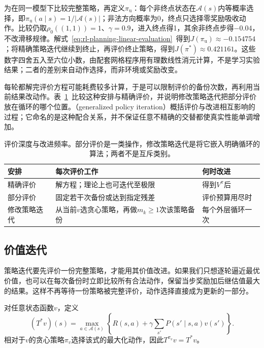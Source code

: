 为在同一模型下比较完整策略，再定义$\pi_{\mathrm u}$：每个非终点状态在$\mathcal A(s)$内等概率选择，即$\pi_{\mathrm u}(a\mid s)=1/|\mathcal A(s)|$；非法方向概率为0，终点只选择零奖励吸收动作。比较仍取$\rho_0((1,1))=1$、$\gamma=0.9$，进入终点得1，其余非终点步得$-0.04$，不改滑移规律。解式~\eqref{eq:rl-planning-linear-evaluation}~得到$J(\pi_{\mathrm u})\approx-0.154754$；将精确策略迭代继续到终止，再评价终止策略，得到$J(\pi^*)\approx0.421161$。这些数字四舍五入至六位小数，由配套网格程序用有理数线性消元计算，不是学习实验结果；二者的差别来自动作选择，而非环境或奖励改变。

每轮都解完评价方程可能耗费较多计算，于是可以限制评价的备份次数，再利用当前结果改动作。表~\ref{tab:rl-planning-evaluation-schedules}~比较这种安排与精确评价，并说明修改策略迭代把部分评价放在循环的哪个位置。（generalized policy iteration）概括评价与改进相互影响的过程；它命名的是这种配合关系，并不保证任意不精确的交替都使真实性能单调增加。

\begin{table}[htbp]
 \centering
 \small
 \begin{tabularx}{\linewidth}{@{}l>{\raggedright\arraybackslash}X>{\raggedright\arraybackslash}X@{}}
  \toprule
  安排 & 每次评价工作 & 何时改进\\
  \midrule
  精确评价 & 解方程；理论上也可迭代至极限 & 得到$V^\pi$后\\
  部分评价 & 固定若干次备份或达到指定残差 & 评价预算用尽时\\
  修改策略迭代 & 从当前$v$选贪心策略，再做$m_k\geq1$次该策略备份 & 每个外层循环一次\\
  \bottomrule
 \end{tabularx}
 \caption{评价深度与改进频率。部分评价是一类操作，修改策略迭代是将它嵌入明确循环的算法；两者不是互斥类别。}
 \label{tab:rl-planning-evaluation-schedules}
\end{table}

\subsection{价值迭代}
\label{sec:rl-planning-value-iteration}

策略迭代要先评价一份完整策略，才能用其价值改进。如果我们只想逐轮逼近最优价值，也可以在每次备份时立即比较所有合法动作，保留当步奖励加后继估值最大的结果。这样不再等待一份策略被完整评价，动作选择直接成为更新的一部分。

\begin{definition}[最优Bellman算子]
 \label{def:rl-planning-optimal-operator}
 对任意状态函数$v$，定义
 \begin{equation}
 (T^*v)(s)=\max_{a\in\mathcal A(s)}
 \left\{R(s,a)+\gamma\sum_{s'}P(s'\mid s,a)v(s')\right\}.
 \label{eq:rl-planning-optimal-operator}
 \end{equation}
 相对于$v$的贪心策略$\pi_v$选择该式的最大化动作，因此$T^{\pi_v}v=T^*v$。
\end{definition}

